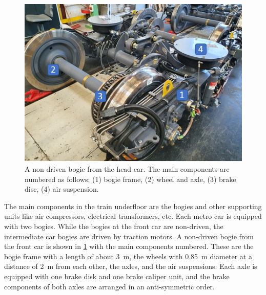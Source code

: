 \begin{figure}[H]
	\centering
	\includegraphics{fig/running_bogie_with_labels.PNG}
	\caption{A non-driven bogie from the head car. The main components are numbered as follows; (1) bogie frame, (2) wheel and axle, (3) brake disc, (4) air suspension.}
	\label{fig:bogie_foto}
\end{figure}

The main components in the train underfloor are the bogies and other supporting units like air compressors, electrical transformers, etc.
Each metro car is equipped with two bogies. While the bogies at the front car are non-driven, the intermediate car bogies are driven by traction motors. A non-driven bogie from the front car is shown in \cref{fig:bogie_foto} with the main components numbered. These are the bogie frame with a length of about \SI{3}{\meter}, the wheels with \SI{0.85}{\meter} diameter at a distance of \SI{2}{\meter} from each other, the axles, and the air suspensions. Each axle is equipped with one brake disk and one brake caliper unit, and the brake components of both axles are arranged in an anti-symmetric order.

